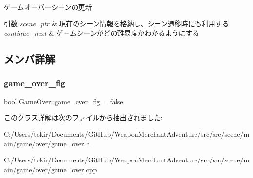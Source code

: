 ゲームオーバーシーンの更新 


\begin{DoxyParams}{引数}
{\em scene\+\_\+ptr} & 現在のシーン情報を格納し、シーン遷移時にも利用する \\
\hline
{\em continue\+\_\+next} & ゲームシーンがどの難易度かわかるようにする \\
\hline
\end{DoxyParams}


\subsection{メンバ詳解}
\mbox{\label{class_game_over_a7de925db0f485b924ef29f4649d2984d}} 
\subsubsection{\texorpdfstring{game\+\_\+over\+\_\+flg}{game\_over\_flg}}
{\footnotesize\ttfamily bool Game\+Over\+::game\+\_\+over\+\_\+flg = false}



このクラス詳解は次のファイルから抽出されました\+:\begin{DoxyCompactItemize}
\item 
C\+:/\+Users/tokir/\+Documents/\+Git\+Hub/\+Weapon\+Merchant\+Adventure/src/src/scene/main/game/over/\mbox{\hyperlink{game__over_8h}{game\+\_\+over.\+h}}\item 
C\+:/\+Users/tokir/\+Documents/\+Git\+Hub/\+Weapon\+Merchant\+Adventure/src/src/scene/main/game/over/\mbox{\hyperlink{game__over_8cpp}{game\+\_\+over.\+cpp}}\end{DoxyCompactItemize}
